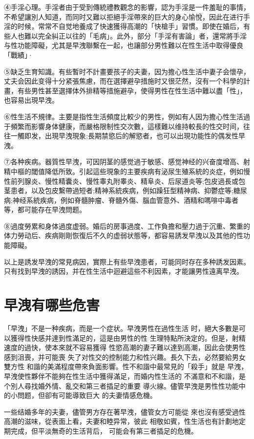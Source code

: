 \documentclass[12pt,UTF8]{ctexbook}
\begin{document}
④手淫心理。手淫者由于受到傳統禮教觀念的影響，認为手淫是一件羞耻的事情，不希望讓別人知道，而同时又難以拒絕手淫帶來的巨大的身心愉悅，因此在进行手淫的时候，常常不自觉地養成了快速獲得高潮的「快槍手」習慣。即使在婚后，有些人也難以完全糾正以往的「毛病」。此外，部分「手淫有害論」者，還常將手淫与性功能障礙，尤其是早洩聯繫在一起，也讓部分男性難以在性生活中取得優良「戰績」·

⑤缺乏生育知識。有些暫时不計畫要孩子的夫妻，因为擔心性生活中妻子会懷孕，丈夫会因此变得十分紧張焦慮，而在選擇避孕措施时又很茫然，沒有一个科學的計畫，有些男性甚至選擇体外排精等措施避孕，使得男性在性生活中難以盡「性」，也容易出現早洩。

⑥性生活不規律。主要是指性生活頻度比較少的男性，例如有人因为擔心性生活過于頻繁而影響身体健康，而嚴格限制性交次數，這樣難以维持較長的性交时间，往往一觸即发，出現早洩現象;長期禁慾后的解慾者，也可以出現功能性的偶发性早洩。

⑦各种疾病。器質性早洩，可因阴茎的感觉過于敏感、感觉神经的兴奋度增高、射精中樞的閾值降低所致。引起這些現象的主要疾病有泌尿生殖系統的炎症，例如慢性前列腺炎、慢性精囊炎、慢性睾丸附睾炎、精阜炎、后尿道炎等;包皮過長或包茎患者，以及包皮繫帶過短者;精神系統疾病，例如躁狂型精神病、抑鬱症等;糖尿病;神经系統疾病，例如脊髓肿瘤、脊髓外傷、腦血管意外、酒精和嗎啡中毒者等，都可能存在早洩問题。

⑧過度勞累和身体過度虚弱。婚后的房事過度、工作負擔和壓力過于沉重、繁重的体力勞动后、疾病剛剛恢復后不久的虚弱状態等，都容易誘发早洩以及其他的性功能障礙。

以上是誘发早洩的常見病因，實際上有些早洩患者，可能同时存在多种誘发因素。只有找到早洩的誘因，并在性生活中迴避這些不利因素，才能讓男性遠离早洩。

\section{早洩有哪些危害}

「早洩」不是一种疾病，而是一个症状。早洩男性在過性生活
时，絕大多數是可以獲得性快感并達到性滿足的，這是由男性的性
生理特點所決定的。但是，射精速度的過快，使本來就不容易獲得
性慾高潮的妻子難以達到高潮，因此会使男性感到沮喪，并可能喪
失了对性交的控制能力和性兴趣。長久下去，必然要給男女雙方性
和諧的美滿程度帶來負面影響。性不和諧中最常見的「殺手」就是
早洩，早洩使性夥伴不能夠在性生活中獲得滿足，而婚内性生活的
不滿意和不和諧，是个別人尋找婚外情、亂交和第三者插足的重要
導火線。儘管早洩是男性性功能中的小問题，但卻有可能導致巨大
的夫妻情感危機。

一些结婚多年的夫妻，儘管男方存在著早洩，儘管女方可能從
來也沒有感受過性高潮的滋味，從表面上看，夫妻和睦异常，彼此
相敬如賓，性生活也有計劃地定期完成，但平淡無奇的生活背后，
可能会有第三者插足的危機。
\end{document}

